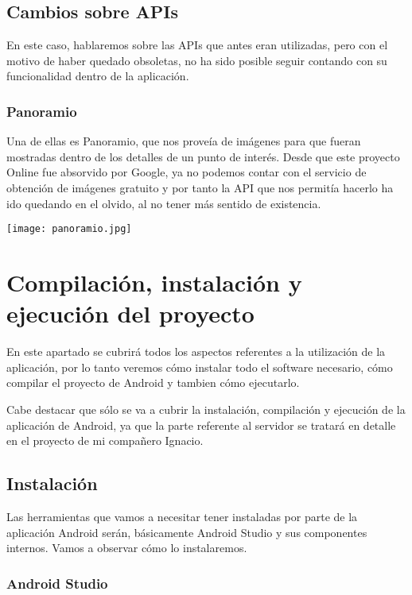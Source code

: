 \subsection{Cambios sobre APIs}

En este caso, hablaremos sobre las APIs que antes eran utilizadas, pero con el motivo de haber quedado obsoletas, no ha sido posible seguir contando con su funcionalidad dentro de la aplicación.

\subsubsection{Panoramio}

Una de ellas es Panoramio, que nos proveía de imágenes para que fueran mostradas dentro de los detalles de un punto de interés. Desde que este proyecto Online fue absorvido por Google, ya no podemos contar con el servicio de obtención de imágenes gratuito y por tanto la API que nos permitía hacerlo ha ido quedando en el olvido, al no tener más sentido de existencia.

\texttt{[image: panoramio.jpg]}

\section{Compilación, instalación y ejecución del proyecto}

En este apartado se cubrirá todos los aspectos referentes a la utilización de la aplicación, por lo tanto veremos cómo instalar todo el software necesario, cómo compilar el proyecto de Android y tambien cómo ejecutarlo.

Cabe destacar que sólo se va a cubrir la instalación, compilación y ejecución de la aplicación de Android, ya que la parte referente al servidor se tratará en detalle en el proyecto de mi compañero Ignacio.

\subsection{Instalación}

Las herramientas que vamos a necesitar tener instaladas por parte de la aplicación Android serán, básicamente Android Studio y sus componentes internos. Vamos a observar cómo lo instalaremos.

\subsubsection{Android Studio}

